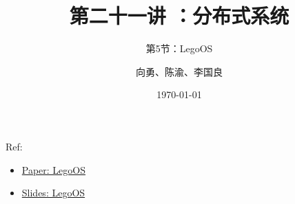 


\title[第21讲]{第二十一讲 ：分布式系统} %
\subtitle{第5节：LegoOS}
\author{向勇、陈渝、李国良} %
\date{\today} %


    
\begin{frame}
    \titlepage %

    
    Ref:
        \begin{itemize}
            \item \href{https://www.usenix.org/system/files/osdi18-shan.pdf}{Paper: LegoOS} %
            \item \href{https://www.usenix.org/sites/default/files/conference/protected-files/osdi18_slides_shan.pdf}{Slides: LegoOS} %
        \end{itemize}
    
\end{frame}
